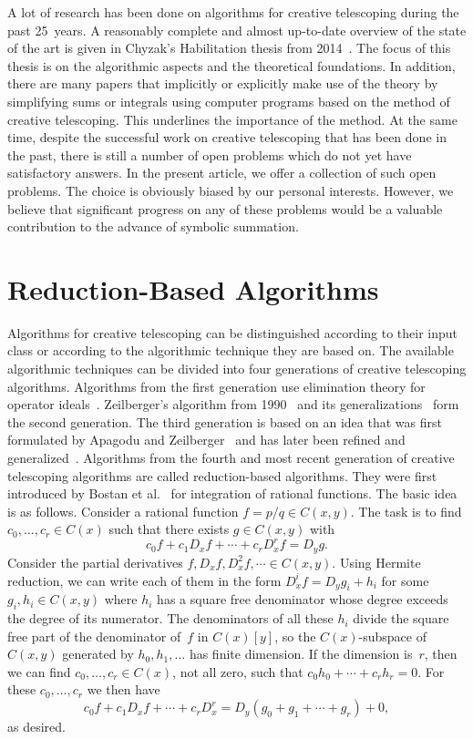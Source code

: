 \documentclass{jssc}
\begin{document}
 A lot of research has been done on algorithms for creative telescoping during
 the past 25~years. A reasonably complete and almost up-to-date overview of the
 state of the art is given in Chyzak's Habilitation thesis from
 2014~\cite{chyzak14}. The focus of this thesis is on the algorithmic aspects
 and the theoretical foundations. In addition, there are many papers that
 implicitly or explicitly make use of the theory by simplifying sums or
 integrals using computer programs based on the method of creative
 telescoping. This underlines the importance of the method. At the same time,
 despite the successful work on creative telescoping that has been done in the
 past, there is still a number of open problems which do not yet have
 satisfactory answers. In the present article, we offer a collection of such
 open problems. The choice is obviously biased by our personal interests.
 However, we believe that significant progress on any of these problems would be
 a valuable contribution to the advance of symbolic summation.

\section{Reduction-Based Algorithms}

 Algorithms for creative telescoping can be distinguished according to their input
 class or according to the algorithmic technique they are based on. The available
 algorithmic techniques can be divided into four generations of creative telescoping algorithms.
 Algorithms from the first generation use elimination theory for operator ideals~\cite{fasenmyer49,takayama90,takayama90a,petkovsek97,wegschaider97,chyzak98}.
 Zeilberger's algorithm from 1990~\cite{zeilberger90a} and its generalizations~\cite{almkvist90,chyzak00,kauers07n,schneider13b} form the second generation.
 The third generation is based on an idea that was first formulated by Apagodu and Zeilberger~\cite{mohammed05,apagodu06}
 and has later been refined and generalized~\cite{koutschan10b,chen12b,chen12c,chen14a}.
 Algorithms from the fourth and most recent generation of creative telescoping algorithms are called
 reduction-based algorithms. They were first introduced by Bostan et al.~\cite{bostan10b} for
 integration of rational functions. The basic idea is as follows. Consider a rational
 function $f=p/q\in C(x,y)$. The task is to find $c_0,\dots,c_r\in C(x)$ such that there
 exists $g\in C(x,y)$ with
 \[
   c_0 f + c_1 D_x f + \cdots + c_r D_x^r f = D_y g.
 \]
 Consider the partial derivatives $f,D_xf,D_x^2f,\cdots\in C(x,y)$. Using Hermite reduction,
 we can write each of them in the form $D_x^i f = D_y g_i + h_i$ for some $g_i,h_i\in C(x,y)$
 where $h_i$ has a square free denominator whose degree exceeds the degree of its numerator.
 The denominators of all these $h_i$ divide the square free part of the denominator of~$f$
 in $C(x)[y]$, so the $C(x)$-subspace of $C(x,y)$ generated by $h_0,h_1,\dots$ has finite
 dimension. If the dimension is~$r$, then we can find $c_0,\dots,c_r\in C(x)$, not all zero,
 such that $c_0h_0+\cdots+c_rh_r=0$. For these $c_0,\dots,c_r$ we then have
 \[
   c_0 f + c_1 D_x f + \cdots + c_r D_x^r = D_y (g_0 + g_1 + \cdots + g_r) + 0,
 \]
 as desired.
\end{document}
